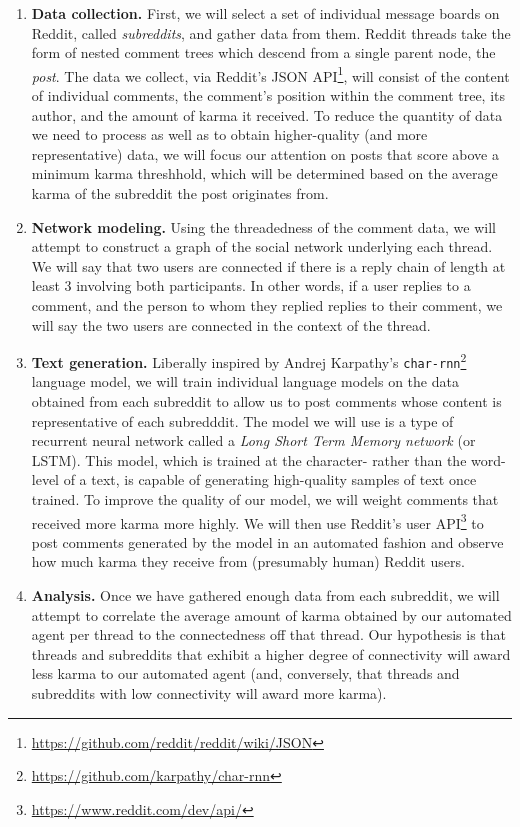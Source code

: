 \documentclass[12pt]{article}
\begin{document}
    \begin{enumerate}
        \item \textbf{Data collection.} First, we will select a set of individual message boards on Reddit, called \textit{subreddits}, and gather data from them. Reddit threads take the form of nested comment trees which descend from a single parent node, the \textit{post}. The data we collect, via Reddit's JSON API\footnote{\url{https://github.com/reddit/reddit/wiki/JSON}}, will consist of the content of individual comments, the comment's position within the comment tree, its author, and the amount of karma it received. To reduce the quantity of data we need to process as well as to obtain higher-quality (and more representative) data, we will focus our attention on posts that score above a minimum karma threshhold, which will be determined based on the average karma of the subreddit the post originates from.
        \item \textbf{Network modeling.} Using the threadedness of the comment data, we will attempt to construct a graph of the social network underlying each thread. We will say that two users are connected if there is a reply chain of length at least 3 involving both participants. In other words, if a user replies to a comment, and the person to whom they replied replies to their comment, we will say the two users are connected in the context of the thread.
        \item \textbf{Text generation.} Liberally inspired by Andrej Karpathy's \texttt{char-rnn}\footnote{\url{https://github.com/karpathy/char-rnn}} language model, we will train individual language models on the data obtained from each subreddit to allow us to post comments whose content is representative of each subredddit. The model we will use is a type of recurrent neural network called a \textit{Long Short Term Memory network} (or LSTM). This model, which is trained at the character- rather than the word-level of a text, is capable of generating high-quality samples of text once trained. To improve the quality of our model, we will weight comments that received more karma more highly. We will then use Reddit's user API\footnote{\url{https://www.reddit.com/dev/api/}} to post comments generated by the model in an automated fashion and observe how much karma they receive from (presumably human) Reddit users.
        \item \textbf{Analysis.} Once we have gathered enough data from each subreddit, we will attempt to correlate the average amount of karma obtained by our automated agent per thread to the connectedness off that thread. Our hypothesis is that threads and subreddits that exhibit a higher degree of connectivity will award less karma to our automated agent (and, conversely, that threads and subreddits with low connectivity will award more karma).
    \end{enumerate}
\end{document}
